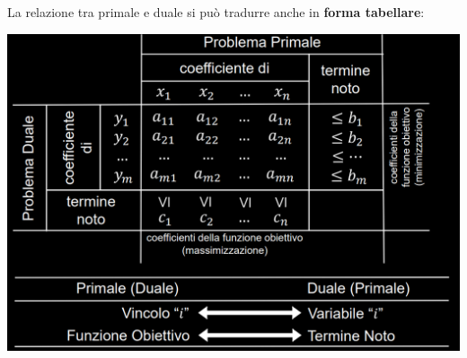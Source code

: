 \documentclass[12pt]{article}
\begin{document}
\newpage \noindent
La relazione tra primale e duale si può tradurre anche in \textbf{forma tabellare}:
\begin{center}
    \includegraphics[width = 0.80\linewidth]{Images/46.png}
\end{center}
\end{document}
